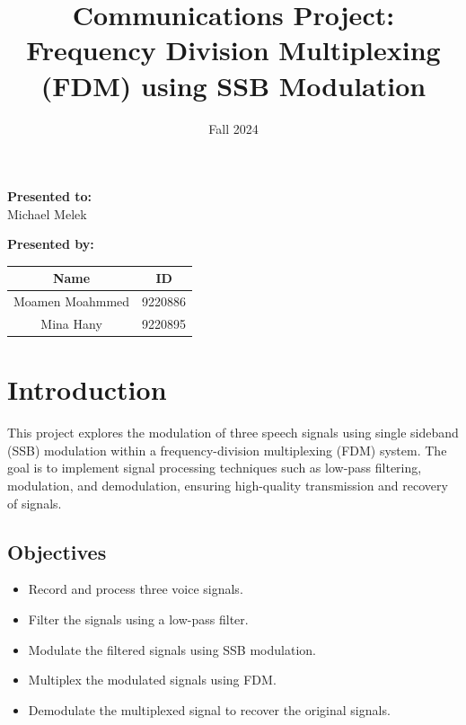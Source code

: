 \documentclass[12pt,a4paper]{article}
\title{Communications Project: Frequency Division Multiplexing (FDM) using SSB Modulation}
\author{}
\date{Fall 2024}
\begin{document}
\maketitle
\begin{center}
    \vspace{1cm}
    \textbf{Presented to:} \\
    Michael Melek
    \vspace{1cm}
\end{center}

\begin{center}
    \vspace{1cm}
    \textbf{Presented by:} \\
\begin{tabular}{|c|c|}
    \hline
    \textbf{Name} & \textbf{ID} \\
    \hline
    Moamen Moahmmed & 9220886 \\
    \hline
    Mina Hany & 9220895 \\
    \hline
\end{tabular}
\end{center}

\newpage

\tableofcontents
\newpage

\section{Introduction}

This project explores the modulation of three speech signals using single sideband (SSB) modulation within a frequency-division multiplexing (FDM) system. The goal is to implement signal processing techniques such as low-pass filtering, modulation, and demodulation, ensuring high-quality transmission and recovery of signals.

\subsection{Objectives}
\begin{itemize}
    \item Record and process three voice signals.
    \item Filter the signals using a low-pass filter.
    \item Modulate the filtered signals using SSB modulation.
    \item Multiplex the modulated signals using FDM.
    \item Demodulate the multiplexed signal to recover the original signals.
\end{itemize}
\end{document}
